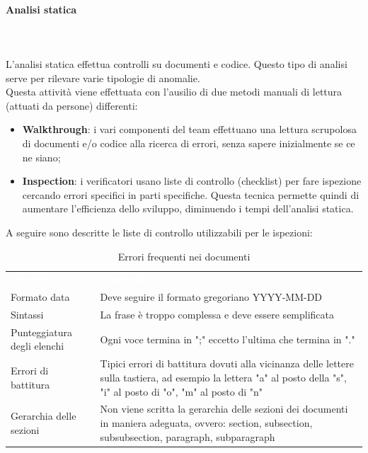 \paragraph*{Analisi statica} \mbox{} \\ \mbox{} \\
L'analisi statica effettua controlli su documenti e codice. Questo tipo di analisi serve per rilevare varie tipologie di anomalie. \\
Questa attività viene effettuata con l'ausilio di due metodi manuali di lettura (attuati da persone) differenti: \begin{itemize}
\item \textbf{Walkthrough}: i vari componenti del team effettuano una lettura scrupolosa di documenti e/o codice alla ricerca di errori, senza sapere inizialmente se ce ne siano;
\item \textbf{Inspection}: i verificatori usano liste di controllo (checklist) per fare ispezione cercando errori specifici in parti specifiche. Questa tecnica permette quindi di aumentare l'efficienza dello sviluppo, diminuendo i tempi dell'analisi statica.
\end{itemize}
A seguire sono descritte le liste di controllo utilizzabili per le ispezioni:
\begin{table}[H]
\caption{Errori frequenti nei documenti}
\begin{center}
\begin{tabular}{C{4cm} | C{12cm}}
\textcolor{white}{\textbf{Oggetto}} & \centerline{\textcolor{white}{\textbf{Controllo}}} \\
Formato data & Deve seguire il formato gregoriano YYYY-MM-DD \\
Sintassi & La frase è troppo complessa e deve essere semplificata \\
Punteggiatura degli elenchi & Ogni voce termina in ";" eccetto l'ultima che termina in "."\\
Errori di battitura & Tipici errori di battitura dovuti alla vicinanza delle
lettere sulla tastiera, ad esempio la lettera "a" al posto della "s", "i" al posto di "o", "m" al posto di "n" \\
Gerarchia delle sezioni & Non viene scritta la gerarchia delle sezioni dei documenti in maniera adeguata, ovvero: section, subsection, subsubsection, paragraph, subparagraph
\end{tabular}
\end{center}
\end{table}

